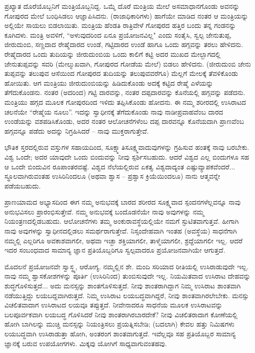 ಪ್ರಖ್ಯಾತ ದೊರೆಯೊಬ್ಬನಿಗೆ ಮಂತ್ರಿಯೊಬ್ಬನಿದ್ದ. ಒಮ್ಮೆ ದೊರೆ ಮಂತ್ರಿಯ ಮೇಲೆ ಅಸಮಾಧಾನಗೊಂಡು ಅವನನ್ನು ಗೋಪುರದ ಮೇಲೆ ಬಂಧಿಸಿಡಲು ಆಜ್ಞಾಪಿಸಿದನು. (ರಾಜಾಧಿಕಾರಿಗಳು) ಹಾಗೆಯೇ ಮಾಡಿದ ನಂತರ ಆ ಮಂತ್ರಿಯನ್ನು ಅಲ್ಲಿಯೇ ಸಾಯಲು ಬಿಡಲಾಯಿತು. ಮಂತ್ರಿಯ ಹೆಂಡತಿ ರಾತ್ರಿವೇಳೆ ಗೋಪುರದ ಹತ್ತಿರ ಬಂದು ತನ್ನ ಗಂಡನನ್ನು ಕೂಗಿದಳು. ಮಂತ್ರಿ ಅವಳಿಗೆ, “ಅಳುವುದರಿಂದ ಏನೂ ಪ್ರಯೋಜನವಿಲ್ಲ" ಎಂದು ಸಂತೈಸಿ, ಸ್ವಲ್ಪ ಜೇನುತುಪ್ಪ, ಜೀರುದುಂಬಿ, ಸಣ್ಣದಾದ ರೇಷ್ಮೆದಾರದ ಉಂಡೆ, ಗಟ್ಟಿದಾರದ ಉಂಡೆ ಹಾಗೂ ಒಂದು ಹಗ್ಗವನ್ನು ತರಲು ಹೇಳಿದನು. ರೇಷ್ಮೆದಾರದ ಒಂದು ತುದಿಯನ್ನು ಜೀರುದುಂಬಿಯ ಒಂದು ಕಾಲಿಗೆ ಕಟ್ಟಿ ಅದರ ಮುಖದ ಮೇಲ್ಬಾಗದಲ್ಲಿ ಜೇನುತುಪ್ಪವನ್ನು ಸವರಿ (ಮೇಲ್ಮುಖವಾಗಿ, ಗೋಪುರದ ಗೋಡೆಯ ಮೇಲೆ) ಬಿಡಲು ಹೇಳಿದನು. (ಜೀರುದುಂಬಿ ಜೇನು ತುಪ್ಪವನ್ನು ತಲುಪುವ ಆಸೆಯಿಂದ ಗೋಪುರದ ತುದಿಯನ್ನು ತಲುಪುವವರೆಗೂ) ಮೆಲ್ಲಗೆ ಮೇಲಕ್ಕೆ ತೆವಳಿಕೊಂಡು ಹೋಯಿತು. ಆಗ ಮಂತ್ರಿಯು ಜೀರುದುಂಬಿಯನ್ನು ಹಿಡಿದುಕೊಂಡು ಅದಕ್ಕೆ ಕಟ್ಟಿದ ರೇಷ್ಮೆ ಎಳೆಯನ್ನು ತೆಗೆದುಕೊಂಡನು. ನಂತರ (ಅದರಿಂದ) ಗಟ್ಟಿ ದಾರವನ್ನು, ನಂತರ ದಪ್ಪದಾರವನ್ನು ಕೊನೆಯಲ್ಲಿ ಹಗ್ಗವನ್ನು ಪಡೆದನು. ಮಂತ್ರಿಯು ಹಗ್ಗದ ಮೂಲಕ ಗೋಪುರದಿಂದ ಇಳಿದು ತಪ್ಪಿಸಿಕೊಂಡು ಹೋದನು. ಈ ನಮ್ಮ ಶರೀರದಲ್ಲಿ ಉಸಿರಾಟದ ಚಲನೆಯೇ “ರೇಷ್ಮೆಯ ನೂಲು”. ಇದನ್ನು ಸ್ವಾಧೀನಕ್ಕೆ ತೆಗೆದುಕೊಂಡು ನಾವು ನಾಡೀಪ್ರವಾಹವೆಂಬ ದಾರದ ಉಂಡೆಯನ್ನು ವಶಪಡಿಸಿಕೊಂಡು, ಅದರ ನಂತರ ಆಲೋಚನೆಗಳೆಂಬ ದಪ್ಪ ದಾರವನ್ನೂ ಕೊನೆಯದಾಗಿ ಪ್ರಾಣವೆಂಬ ಹಗ್ಗವನ್ನೂ ಪಡೆದು ಅದನ್ನು ನಿಗ್ರಹಿಸಿದರೆ – ನಾವು ಮುಕ್ತರಾಗುತ್ತೇವೆ.

\vskip 1.5pt

ಭೌತಿಕ ಸ್ತರದಲ್ಲಿರುವ ವಸ್ತುಗಳ ಸಹಾಯದಿಂದ, ಸೂಕ್ಷ್ಮಾತಿಸೂಕ್ಷ್ಮವಾದುವುಗಳನ್ನು ಗ್ರಹಿಸುವ ಹಂತಕ್ಕೆ ನಾವು ಬರಬೇಕು. ವಿಶ್ವ ಒಂದೇ; ಅದರ ಯಾವುದೇ ಒಂದು ಬಿಂದುವನ್ನು ನೀವು ಸ್ಪರ್ಶಿಸಬಹುದು. ಆದರೆ ವಿಶ್ವದ ಎಲ್ಲ ಬಿಂದುಗಳೂ ಸಹ ಆ ಒಂದೇ ಬಿಂದುವಿನ ರೂಪಾಂತರವಷ್ಟೆ. ವಿಶ್ವದ ನೆಲೆಯಲ್ಲಿರುವ ಏಕತ್ವ ವಿಶ್ವದಾದ್ಯಂತ ಎಷ್ಟು\break ವ್ಯಾಪಕವೆಂದರೆ... ಸ್ಥೂಲವಾಗಿರುವಂತಹ ಉಸಿರಿನಿಂದಲೂ (ಅಥವಾ ಶ್ವಾಸ – ಪ್ರಶ್ವಾಸ ಕ್ರಿಯೆಯಿಂದಲೂ) ನಾನು ಆತ್ಮವನ್ನೇ ಪಡೆಯಬಹುದು.

\vskip 1.5pt

ಪ್ರಾಣಯಾಮದ ಅಭ್ಯಾಸದಿಂದ ಈಗ ನಮ್ಮ ಅನುಭವಕ್ಕೆ ಬಾರದ ಶರೀರದ ಸೂಕ್ಷ್ಮವಾದ ಸ್ಪಂದನಗಳೆಲ್ಲವನ್ನೂ ನಾವು ಅನುಭವಿಸಲು ಪ್ರಾರಂಭಿಸುತ್ತೇವೆ. ನಮ್ಮ ಅನುಭವಕ್ಕೆ ಬಂದೊಡನೆಯೇ ನಾವು ಅವುಗಳನ್ನು ನಮ್ಮ ನಿಯಂತ್ರಣದಲ್ಲಿಡಬಹುದು. ಆಲೋಚನೆಗಳು ತಮ್ಮ ಅಂಕುರಾವಸ್ಥೆಯಲ್ಲಿಯೇ ನಮಗೆ ಸ್ಫುಟಿತವಾಗುತ್ತವೆ. ಹೀಗಾಗಿ ನಾವು ಅವುಗಳನ್ನು ಸ್ವಾಧೀನದಲ್ಲಿಡಲು ಸಮರ್ಥರಾಗುತ್ತೇವೆ. ನಿಸ್ಸಂದೇಹವಾಗಿ ಇಂತಹ (ಅವಸ್ಥೆಯ) ಸಾಧನೆಗಾಗಿ ನಮ್ಮಲ್ಲಿ ಎಲ್ಲರಿಗೂ ಅವಕಾಶವಾಗಲೀ, ಅಥವಾ ಇಚ್ಛಾ ಶಕ್ತಿಯಾಗಲೀ, ತಾಳ್ಮೆಯಾಗಲೀ, ಶ್ರದ್ದೆಯಾಗಲೀ ಇಲ್ಲ. ಆದರೆ ಇದರ ಸಂಬಂಧವಾದ ಸಾಮಾನ್ಯ ಜ್ಞಾನ ಪ್ರತಿಯೊಬ್ಬರಿಗೂ ಸ್ವಲ್ಪವಾದರೂ ಪ್ರಯೋಜನವಾಗಿಯೇ ಆಗುತ್ತದೆ.

\vskip 1.5pt

ಮೊದಲನೆ ಪ್ರಯೋಜನವೇ ಸ್ವಾಸ್ಥ್ಯ, ಆರೋಗ್ಯ. ನಮ್ಮಲ್ಲಿನ ಶೇ. ಮಂದಿ ಸರಿಯಾದ ರೀತಿಯಲ್ಲಿ ಉಸಿರಾಡುವುದೇ ಇಲ್ಲ. ನಾವು ನಮ್ಮ ಶ್ವಾಸಕೋಶಗಳನ್ನು ಪೂರ್ತಿ (ಉಸಿರಿನಿಂದ) ತುಂಬಿಸುವುದೇ ಇಲ್ಲ. ನಿಯಮಿತವಾದ ಉಸಿರಾಟ ದೇಹವನ್ನು ಶುದ್ಧಗೊಳಿಸುತ್ತದೆ... ಅದು ಮನಸ್ಸನ್ನು ಶಾಂತಗೊಳಿಸುತ್ತದೆ. ನೀವು ಶಾಂತರಾಗಿದ್ದಾಗ ನಿಮ್ಮ ಉಸಿರಾಟ ಶಾಂತವಾಗಿ ನಡೆಯುತ್ತಿದ್ದು ಲಯಬದ್ದವಾಗಿರುತ್ತದೆ. ನಿಮ್ಮ ಉಸಿರಾಟ ಲಯಬದ್ಧವಾಗಿದ್ದರೆ, ನೀವು ಶಾಂತವಾಗಿರಲೇಬೇಕು. ಮನಸ್ಸು ವಿಚಲಿತವಾದಾಗ ಉಸಿರಾಟದ ಲಯವೂ ತಪ್ಪುತ್ತದೆ. ನೀವೇನಾದರೂ ಸಾಧನೆಯ ಮೂಲಕ ಉಸಿರಾಟವನ್ನು ಬಲಪೂರ್ವಕವಾಗಿ ಲಯಬದ್ಧ ಗೊಳಿಸಿದರೆ ನೀವು ಶಾಂತರಾಗಿರಬಾರದೇಕೆ? ನೀವು ವಿಚಲಿತರಾದಾಗ ಕೋಣೆಯಲ್ಲಿ ಹೋಗಿ ಬಾಗಿಲನ್ನು ಮುಚ್ಚಿ ಮನಸ್ಸನ್ನು ನಿಯಂತ್ರಿಸಲು ಪ್ರಯತ್ನಿಸಬೇಡಿ; (ಬದಲಾಗಿ) ಕೇವಲ ಹತ್ತು ನಿಮಿಷಗಳು ಲಯಬದ್ಧವಾಗಿ ಉಸಿರಾಡುತ್ತಾ ಹೋಗಿ, ಅಂತರಂಗ ಶಾಂತವಾಗುತ್ತದೆ. ಇವೆಲ್ಲವೂ ಸಹ ಪ್ರತಿಯೊಬ್ಬರ ಸಾಮಾನ್ಯ ಜ್ಞಾನಕ್ಕೆ ಬರುವ ಉಪಯೋಗಗಳು. ಮಿಕ್ಕವು ಯೋಗಿಗೆ ಸಾಧ್ಯವಾಗುವಂತಹವು.

